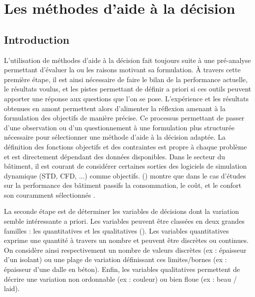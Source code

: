 
\section{Les méthodes d’aide à la décision} %
\label{sec:les_methodes_d_aide_à_la_decision}
\subsection{Introduction} %
\label{sub:introduction}


L’utilisation de méthodes d’aide à la décision fait toujours suite à une pré-analyse
permettant d’évaluer la ou les raisons motivant sa formulation.
À travers cette première étape, il est ainsi nécessaire de faire le bilan de la
performance actuelle, le résultats voulus, et les pistes permettant de définir a
priori si ces outils peuvent apporter une réponse aux questions que l’on se pose.
L’expérience et les résultats obtenues en amont permettent alors d’alimenter
la réflexion amenant à la formulation des objectifs de manière précise.
Ce processus permettant de passer d’une observation ou d’un questionnement à une
formulation plus structurée nécessaire pour sélectionner une méthode d’aide à la décision
adaptée.
La définition des fonctions objectifs et des contraintes est propre à chaque problème
et est directement dépendant des données disponibles.
Dans le secteur du bâtiment, il est courant de considérer certaines sorties des
logiciels de simulation dynamique (STD, CFD, ...) comme objectifs.
() montre que dans le cas d’études sur la
performance des bâtiment passifs la consommation, le coût, et le confort son
couramment sélectionnés .

La seconde étape est de déterminer les variables de décisions dont la variation
semble intéressante a priori. Les variables peuvent être classées en deux grandes
familles : les quantitatives et les qualitatives ().
Les variables quantitatives exprime une quantité à travers un nombre et
peuvent être discrètes ou continues. On considère ainsi respectivement un nombre de
valeurs discrètes (ex : épaisseur d’un isolant) ou une plage de variation définissant
ces limites/bornes (ex : épaisseur d’une dalle en béton).
Enfin, les variables qualitatives permettent de décrire une variation non ordonnable
(ex : couleur) ou bien floue (ex : beau / laid).

